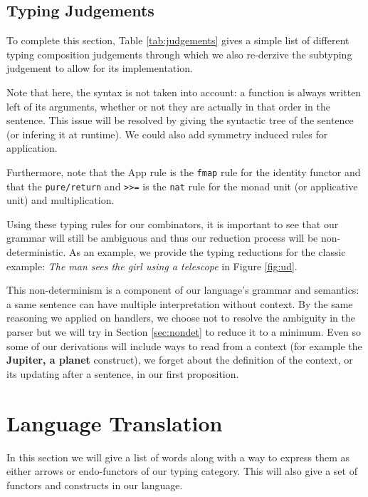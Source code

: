 \documentclass[math, english, info]{cours}
\begin{document}
\subsection{Typing Judgements}\label{subsec:judgements}
To complete this section, Table \ref{tab:judgements} gives a simple list of different typing composition judgements through which we also re-derzive the subtyping judgement to allow for its implementation.
\begin{table}
	\caption{Typing and Subtyping Judgements}
	\label{tab:judgements}
\end{table}
Note that here, the syntax is not taken into account: a function is always written left of its arguments, whether or not they are actually in that order in the sentence.
This issue will be resolved by giving the syntactic tree of the sentence (or infering it at runtime).
We could also add symmetry induced rules for application.

Furthermore, note that the App rule is the \texttt{fmap} rule for the identity functor and that the \texttt{pure/return} and \texttt{>>=} is the \texttt{nat} rule for the monad unit (or applicative unit) and multiplication.

\medskip

Using these typing rules for our combinators, it is important to see that our grammar will still be ambiguous and thus our reduction process will be non-deterministic.
As an example, we provide the typing reductions for the classic example: \textsl{The man sees the girl using a telescope} in Figure \ref{fig:ud}.

\begin{figure*}
	\centering
	\caption{Parsing trees for the typing of \textsl{The man sees the girl using a telescope}.}
	\label{fig:ud}
\end{figure*}

This non-determinism is a component of our language's grammar and semantics: a same sentence can have multiple interpretation without context.
By the same reasoning we applied on handlers, we choose not to resolve the ambiguity in the parser but we will try in Section \ref{sec:nondet} to reduce it to a minimum.
Even so some of our derivations will include ways to read from a context (for example the \textbf{Jupiter, a planet} construct), we forget about the definition of the context, or its updating after a sentence, in our first proposition.

\section{Language Translation}
\label{sec:language}
In this section we will give a list of words along with a way to express them as either arrows or endo-functors of our typing category.
This will also give a set of functors and constructs in our language.
\end{document}
